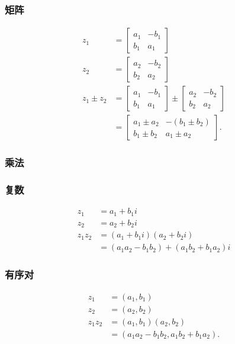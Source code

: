 \subsubsection*{矩阵}
$$
\begin{aligned}
z_{1} & =\left[\begin{array}{ll}
a_{1} & -b_{1} \\
b_{1} & a_{1}
\end{array}\right] \\
z_{2} & =\left[\begin{array}{cc}
a_{2} & -b_{2} \\
b_{2} & a_{2}
\end{array}\right] \\
z_{1} \pm z_{2} & =\left[\begin{array}{cc}
a_{1} & -b_{1} \\
b_{1} & a_{1}
\end{array}\right] \pm\left[\begin{array}{cc}
a_{2} & -b_{2} \\
b_{2} & a_{2}
\end{array}\right] \\
& =\left[\begin{array}{cc}
a_{1} \pm a_{2} & -\left(b_{1} \pm b_{2}\right) \\
b_{1} \pm b_{2} & a_{1} \pm a_{2}
\end{array}\right] .
\end{aligned}
$$

\subsubsection{乘法}
\subsubsection*{复数}

$$
\begin{aligned}
z_{1} & =a_{1}+b_{1} i \\
z_{2} & =a_{2}+b_{2} i \\
z_{1} z_{2} & =\left(a_{1}+b_{1} i\right)\left(a_{2}+b_{2} i\right) \\
& =\left(a_{1} a_{2}-b_{1} b_{2}\right)+\left(a_{1} b_{2}+b_{1} a_{2}\right) i
\end{aligned}
$$

\subsubsection*{有序对}
$$
\begin{aligned}
z_{1} & =\left(a_{1}, b_{1}\right) \\
z_{2} & =\left(a_{2}, b_{2}\right) \\
z_{1} z_{2} & =\left(a_{1}, b_{1}\right)\left(a_{2}, b_{2}\right) \\
& =\left(a_{1} a_{2}-b_{1} b_{2}, a_{1} b_{2}+b_{1} a_{2}\right) .
\end{aligned}
$$

